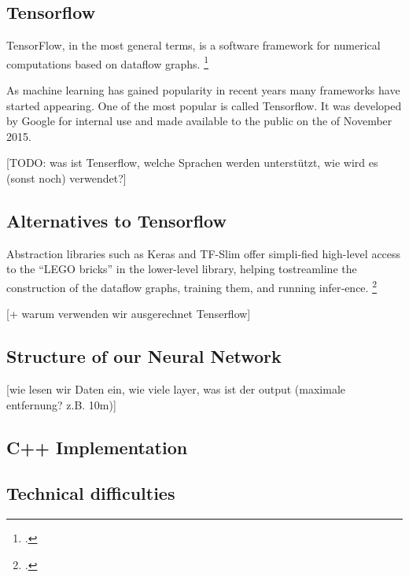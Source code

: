 \subsection{Tensorflow}
TensorFlow,  in  the  most  general  terms,  is  a  software  framework  for  numerical  computations based on dataflow graphs. \footcite[page ]{Hope_Learning_TensorFlow}

As machine learning has gained popularity in recent years many frameworks have started appearing. One of the most popular is called Tensorflow. It was developed by Google for internal use and made available to the public on the  of November 2015.

[TODO: was ist Tenserflow, welche Sprachen werden unterstützt, wie wird es (sonst noch) verwendet?]

\subsection{Alternatives to Tensorflow}

Abstraction libraries such as Keras and TF-Slim offer simpli‐fied  high-level  access  to  the  “LEGO  bricks”  in  the  lower-level  library,  helping  tostreamline the construction of the dataflow graphs, training them, and running infer‐ence. \footcite[page 7]{Hope_Learning_TensorFlow}

[+ warum verwenden wir ausgerechnet Tenserflow]

\subsection{Structure of our Neural Network}

[wie lesen wir Daten ein, wie viele layer, was ist der output (maximale entfernung? z.B. 10m)]

\subsection{C++ Implementation}

\subsection{Technical difficulties}

\filbreak